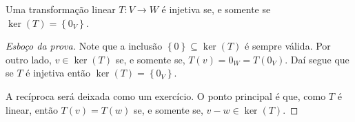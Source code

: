 \begin{theorem}
	Uma transformação linear $T\colon V\to W$ é injetiva se, e somente se $\ker(T)=\left\{0_V\right\}$.
\end{theorem}

\begin{proof}[Esboço da prova]
	Note que a inclusão $\left\{0\right\}\subseteq\ker(T)$ é sempre válida. Por outro lado, $v\in\ker(T)$ se, e somente se, $T(v)=0_W=T(0_V)$. Daí segue que se $T$ é injetiva então $\ker(T)=\left\{0_V\right\}$.
	
	A recíproca será deixada como um exercício. O ponto principal é que, como $T$ é linear, então $T(v)=T(w)$ se, e somente se, $v-w\in\ker(T)$.
\end{proof}
	